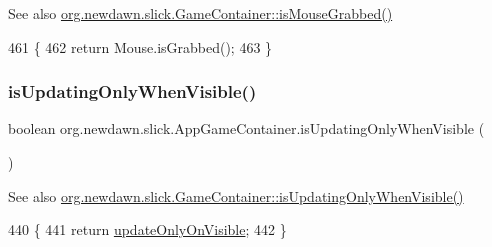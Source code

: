 \begin{DoxySeeAlso}{See also}
\mbox{\hyperlink{classorg_1_1newdawn_1_1slick_1_1_game_container_ad560cb00f8b4695169ec71ff73571c41}{org.\+newdawn.\+slick.\+Game\+Container\+::is\+Mouse\+Grabbed()}} 
\end{DoxySeeAlso}

\begin{DoxyCode}
461                                     \{
462         \textcolor{keywordflow}{return} Mouse.isGrabbed();
463     \}
\end{DoxyCode}
\mbox{\label{classorg_1_1newdawn_1_1slick_1_1_app_game_container_a7170572186df9d087212af752d6056f5}} 
\subsubsection{\texorpdfstring{is\+Updating\+Only\+When\+Visible()}{isUpdatingOnlyWhenVisible()}}
{\footnotesize\ttfamily boolean org.\+newdawn.\+slick.\+App\+Game\+Container.\+is\+Updating\+Only\+When\+Visible (\begin{DoxyParamCaption}{ }\end{DoxyParamCaption})\hspace{0.3cm}{\ttfamily [inline]}}

\begin{DoxySeeAlso}{See also}
\mbox{\hyperlink{classorg_1_1newdawn_1_1slick_1_1_game_container_af38f108ac8b1ea17f4e75828b9777007}{org.\+newdawn.\+slick.\+Game\+Container\+::is\+Updating\+Only\+When\+Visible()}} 
\end{DoxySeeAlso}

\begin{DoxyCode}
440                                                \{
441         \textcolor{keywordflow}{return} \mbox{\hyperlink{classorg_1_1newdawn_1_1slick_1_1_app_game_container_a8ed58465ae60f67d13fa69ea7929d3ef}{updateOnlyOnVisible}};
442     \}
\end{DoxyCode}
\mbox{\label{classorg_1_1newdawn_1_1slick_1_1_app_game_container_a1b0b230965ebebc9d4f43acf93986fd3}} 
